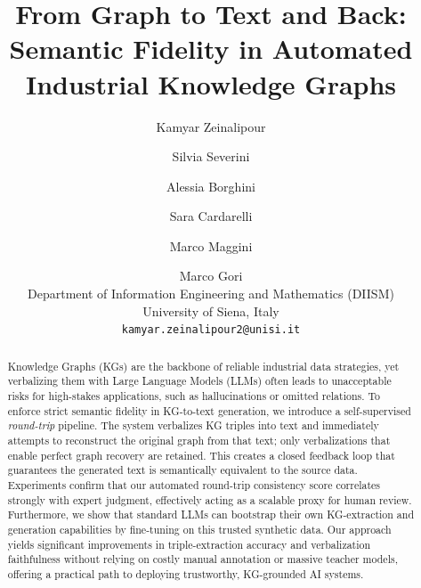 \documentclass[11pt]{article}
\title{From Graph to Text and Back: 
Semantic Fidelity in Automated Industrial Knowledge Graphs}
\author{Kamyar Zeinalipour \and Silvia Severini \and Alessia Borghini \and Sara Cardarelli \and Marco Maggini \and Marco Gori \\
  Department of Information Engineering and Mathematics (DIISM) \\
  University of Siena, Italy \\
  \texttt{kamyar.zeinalipour2@unisi.it}}
\begin{document}
\maketitle

\begin{abstract}
Knowledge Graphs (KGs) are the backbone of reliable industrial data strategies, yet verbalizing them with Large Language Models (LLMs) often leads to unacceptable risks for high-stakes applications, such as hallucinations or omitted relations. To enforce strict semantic fidelity in KG-to-text generation, we introduce a self-supervised \emph{round-trip} pipeline. The system verbalizes KG triples into text and immediately attempts to reconstruct the original graph from that text; only verbalizations that enable perfect graph recovery are retained. This creates a closed feedback loop that guarantees the generated text is semantically equivalent to the source data. Experiments confirm that our automated round-trip consistency score correlates strongly with expert judgment, effectively acting as a scalable proxy for human review. Furthermore, we show that standard LLMs can bootstrap their own KG-extraction and generation capabilities by fine-tuning on this trusted synthetic data. Our approach yields significant improvements in triple-extraction accuracy and verbalization faithfulness without relying on costly manual annotation or massive teacher models, offering a practical path to deploying trustworthy, KG-grounded AI systems.
\end{abstract}
\end{document}
